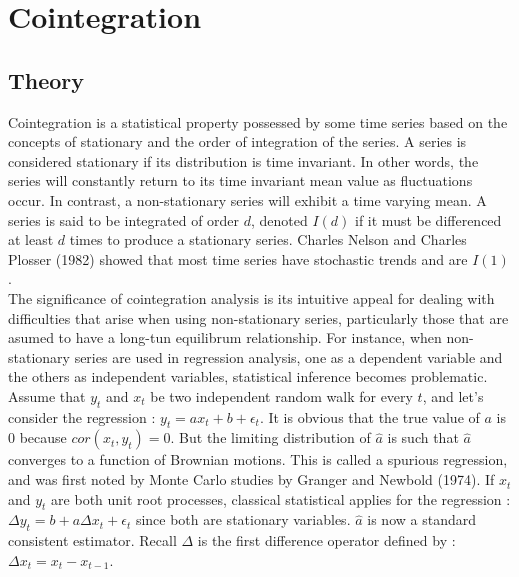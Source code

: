 \documentclass[11pt,a4,twosided,singlespacing,titlepagenumber=on]{scrreprt}
\numberwithin{equation}{chapter} %
\theoremstyle{remark}
\begin{document}


\chapter{Cointegration}

\section{Theory}
Cointegration is a statistical property possessed by some time series based on the concepts of stationary and the order of integration of the series. A series is considered stationary if its distribution is time invariant. In other words, the series will constantly return to its time invariant mean value as fluctuations occur. In contrast, a non-stationary series will exhibit a time varying mean. A series is said to be integrated of order $d$, denoted $I(d)$ if it must be differenced at least $d$ times to produce a stationary series.
Charles Nelson and Charles Plosser (1982) showed that most time series have stochastic trends and are $I(1)$. \\

The significance of cointegration analysis is its intuitive appeal for dealing with difficulties that arise when using non-stationary series, particularly those that are asumed to have a long-tun equilibrum relationship. For instance, when non-stationary series are used in regression analysis, one as a dependent variable and the others as independent variables, statistical inference becomes problematic. Assume that $y_t$ and $x_t$ be two independent random walk for every $t$, and let's consider the regression : $y_t = a x_t + b + \epsilon_t$. It is obvious that the true value of $a$ is 0 because $cor(x_t, y_t) = 0$. But the limiting distribution of $\hat{a}$ is such that $\hat{a}$ converges to a function of Brownian motions. This is called a spurious regression, and was first noted by Monte Carlo studies by Granger and Newbold (1974). If $x_t$ and $y_t$ are both unit root processes, classical statistical applies for the regression : $\Delta y_t = b + a \Delta x_t + \epsilon_t$ since both are stationary variables. $\hat{a}$ is now a standard consistent estimator. Recall $\Delta$ is the first difference operator defined by : $\Delta x_t = x_t - x_{t-1}$. \\
\end{document}
